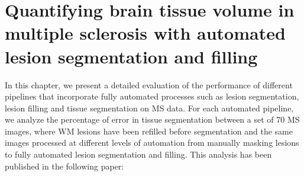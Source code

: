 
\chapter{Quantifying brain tissue volume in multiple sclerosis with automated lesion segmentation and filling}  

\label{chapter:chapter_5}

In this chapter, we present a detailed evaluation of the performance of different pipelines that incorporate fully automated processes such as lesion segmentation, lesion filling and tissue segmentation on MS data. For each automated pipeline, we analyze the percentage of error in tissue segmentation between a set of 70 MS images, where WM lesions have been refilled before segmentation and the same images processed at different levels of automation from manually masking lesions to fully automated lesion segmentation and filling. This analysis has been published in the following paper:

\vspace{2cm}

\noindent{}






